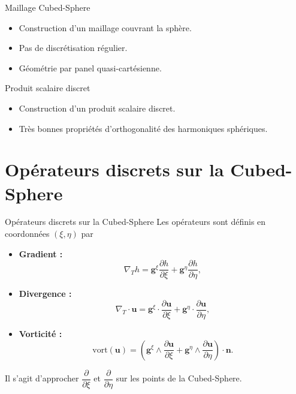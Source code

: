 \documentclass[11pt]{beamer}
\begin{document}
\begin{frame}{}
\begin{block}{Maillage Cubed-Sphere}
\begin{itemize}
\item Construction d'un maillage couvrant la sphère.
\item Pas de discrétisation régulier.
\item Géométrie par panel quasi-cartésienne.
\end{itemize}
\end{block}

\begin{block}{Produit scalaire discret}
\begin{itemize}
\item Construction d'un produit scalaire discret.
\item Très bonnes propriétés d'orthogonalité des harmoniques sphériques.
\end{itemize}
\end{block}
\end{frame}






\section{Opérateurs discrets sur la Cubed-Sphere}
\begin{frame}{Opérateurs discrets sur la Cubed-Sphere}
Les opérateurs sont définis en coordonnées $(\xi,\eta)$ par
\begin{block}{}
\begin{itemize}
\item \textbf{Gradient :}
$$
\nabla_T h = \mathbf{g}^{\xi} \dfrac{\partial h}{\partial \xi} + \mathbf{g}^{\eta} \dfrac{\partial h}{\partial \eta},
$$
\item \textbf{Divergence :}
$$
\nabla_T \cdot \mathbf{u} = \mathbf{g}^{\xi} \cdot \dfrac{\partial \mathbf{u}}{\partial \xi} + \mathbf{g}^{\eta} \cdot \dfrac{\partial \mathbf{u}}{\partial \eta},
$$
\item \textbf{Vorticité :}
$$
\text{vort}(\mathbf{u}) = \left( \mathbf{g}^{\xi} \wedge \dfrac{\partial \mathbf{u}}{\partial \xi} + \mathbf{g}^{\eta} \wedge \dfrac{\partial \mathbf{u}}{\partial \eta} \right) \cdot \mathbf{n}.
$$
\end{itemize}
\end{block}
Il s'agit d'approcher $\dfrac{\partial}{\partial \xi}$ et $\dfrac{\partial}{\partial \eta}$ sur les points de la Cubed-Sphere.
\end{frame}
\end{document}
